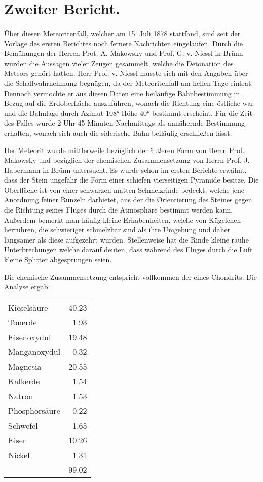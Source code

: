 \documentclass[a4paper, 11pt, oneside]{article}
\begin{document}
\section{Zweiter Bericht.}
\paragraph{}
Über diesen Meteoritenfall, welcher am 15. Juli 1878 stattfand, sind seit der Vorlage des ersten Berichtes noch fernere Nachrichten eingelaufen. Durch die Bemühungen der Herren Prot. A. Makowsky und Prof. G. v. Niessl in Brünn wurden die Aussagen vieler Zeugen gesammelt, welche die Detonation des Meteors gehört hatten. Herr Prof. v. Niessl musste sich mit den Angaben über die Schallwahrnehmung begnügen, da der Meteoritenfall am hellen Tage eintrat. Dennoch vermochte er aus diesen Daten eine beiläufige Bahnbestimmung in Bezug auf die Erdoberfläche auszuführen, wonach die Richtung eine östliche war und die Bahnlage durch Azimut 108° Höhe 40° bestimmt erscheint. Für die Zeit des Falles wurde 2 Uhr 45 Minuten Nachmittags als annähernde Bestimmung erhalten, wonach sich auch die siderische Bahn beiläufig erschließen lässt.

Der Meteorit wurde mittlerweile bezüglich der äußeren Form von Herrn Prof. Makowsky und bezüglich der chemischen Zusammensetzung von Herrn Prof. J. Habermann in Brünn untersucht. Es wurde schon im ersten Berichte erwähnt, dass der Stein ungefähr die Form einer schiefen vierseitigen Pyramide besitze. Die Oberfläche ist von einer schwarzen matten Schmelzrinde bedeckt, welche jene Anordnung feiner Runzeln darbietet, aus der die Orientierung des Steines gegen die Richtung seines Fluges durch die Atmosphäre bestimmt werden kann. Außerdem bemerkt man häufig kleine Erhabenheiten, welche von Kügelchen herrühren, die schwieriger schmelzbar sind als ihre Umgebung und daher langsamer als diese aufgezehrt wurden. Stellenweise hat die Rinde kleine rauhe Unterbrechungen welche darauf deuten, dass während des Fluges durch die Luft kleine Splitter abgesprungen seien.

Die chemische Zusammensetzung entspricht vollkommen der eines Chondrits. Die Analyse ergab:
\begin{center}
\begin{tabular}{ l r }
    Kieselsäure & 40.23\\
    Tonerde & 1.93\\
    Eisenoxydul & 19.48\\
    Manganoxydul & 0.32\\
    Magnesia & 20.55\\
    Kalkerde & 1.54\\
    Natron & 1.53\\
    Phosphorsäure & 0.22\\
    Schwefel & 1.65\\
    Eisen & 10.26\\
    Nickel & 1.31\\
     & 99.02\\
\end{tabular}
\end{center}
\end{document}
